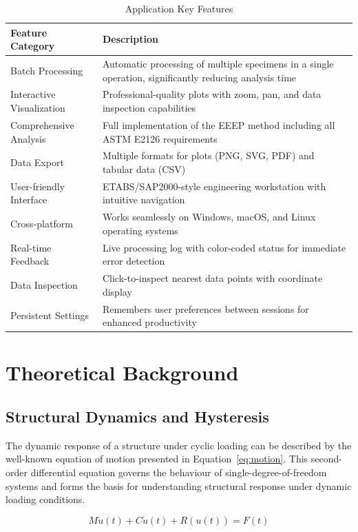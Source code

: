 \documentclass[11pt,a4paper]{article}
\begin{document}
\begin{table}[h]
\centering
\caption{Application Key Features}\label{tab:features}
\begin{tabular}{p{5cm}p{10cm}}
\toprule
\textbf{Feature Category} & \textbf{Description} \\
\midrule
Batch Processing & Automatic processing of multiple specimens in a single operation, significantly reducing analysis time \\
Interactive Visualization & Professional-quality plots with zoom, pan, and data inspection capabilities \\
Comprehensive Analysis & Full implementation of the EEEP method including all ASTM E2126 requirements \\
Data Export & Multiple formats for plots (PNG, SVG, PDF) and tabular data (CSV) \\
User-friendly Interface & ETABS/SAP2000-style engineering workstation with intuitive navigation \\
Cross-platform & Works seamlessly on Windows, macOS, and Linux operating systems \\
Real-time Feedback & Live processing log with color-coded status for immediate error detection \\
Data Inspection & Click-to-inspect nearest data points with coordinate display \\
Persistent Settings & Remembers user preferences between sessions for enhanced productivity \\
\bottomrule
\end{tabular}
\end{table}

\section{Theoretical Background}

\subsection{Structural Dynamics and Hysteresis}

The dynamic response of a structure under cyclic loading can be described by the well-known equation of motion presented in Equation~\ref{eq:motion}. This second-order differential equation governs the behaviour of single-degree-of-freedom systems and forms the basis for understanding structural response under dynamic loading conditions.

\begin{equation}
M\ddot{u}(t) + C\dot{u}(t) + R(u(t)) = F(t)
\label{eq:motion}
\end{equation}
\end{document}
